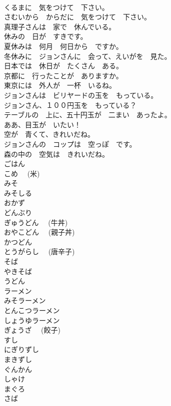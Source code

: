\documentclass[8pt]{extreport}
\begin{document}
\begin{CJK}{UTF8}{min}
\\	くるまに　気をつけて　下さい。	
\\	さむいから　からだに　気をつけて　下さい。	
\\	真理子さんは　家で　休んでいる。	
\\	休みの　日が　すきです。	
\\	夏休みは　何月　何日から　ですか。	
\\	冬休みに　ジョンさんに　会って、えいがを　見た。	
\\	日本では　休日が　たくさん　ある。	
\\	京都に　行ったことが　ありますか。	
\\	東京には　外人が　一杯　いるね。	
\\	ジョンさんは　ビリヤードの玉を　もっている。	
\\	ジョンさん、１００円玉を　もっている？	
\\	テーブルの　上に、五十円玉が　二まい　あったよ。	
\\	ああ、目玉が　いたい！	
\\	空が　青くて、きれいだね。	
\\	ジョンさんの　コップは　空っぽ　です。	
\\	森の中の　空気は　きれいだね。	
\\	ごはん	
\\	こめ　 (米)	
\\	みそ	
\\	みそしる	
\\	おかず	
\\	どんぶり	
\\	ぎゅうどん　 (牛丼)	
\\	おやこどん　 (親子丼)	
\\	かつどん	
\\	とうがらし　 (唐辛子)	
\\	そば	
\\	やきそば	
\\	うどん	
\\	ラーメン	
\\	みそラーメン	
\\	とんこつラーメン	
\\	しょうゆラーメン	
\\	ぎょうざ　 (餃子)	
\\	すし	
\\	にぎりずし	
\\	まきずし	
\\	ぐんかん	
\\	しゃけ	
\\	まぐろ	
\\	さば	

\end{CJK}
\end{document}
